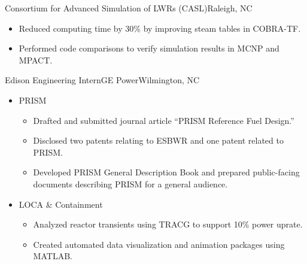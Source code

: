 \documentclass[letterpaper,11pt,nocolor,final]{moderncv}
\begin{document}
{Consortium for Advanced Simulation of LWRs (CASL)}{Raleigh, NC}{}{
  \begin{itemize}
    \item Reduced computing time by 30\% by improving steam tables in COBRA-TF.
    \item Performed code comparisons to verify simulation results in MCNP and 
      MPACT.
  \end{itemize}}

{Edison Engineering Intern}{GE Power}{Wilmington, NC}{}{
  \begin{itemize}
    \item PRISM 
    \begin{itemize}
      \item Drafted and submitted journal article
        ``PRISM Reference Fuel Design.''
      \item Disclosed two patents relating to ESBWR and one patent related to 
        PRISM.
      \item Developed PRISM General Description Book and prepared public-facing
        documents describing PRISM for a general audience.
    \end{itemize}
    \item LOCA \& Containment 
    \begin{itemize}
      \item Analyzed reactor transients using TRACG to support 10\% power 
        uprate.
      \item Created automated data visualization and animation packages using 
        MATLAB.
    \end{itemize}
  \end{itemize}}


\end{document}
